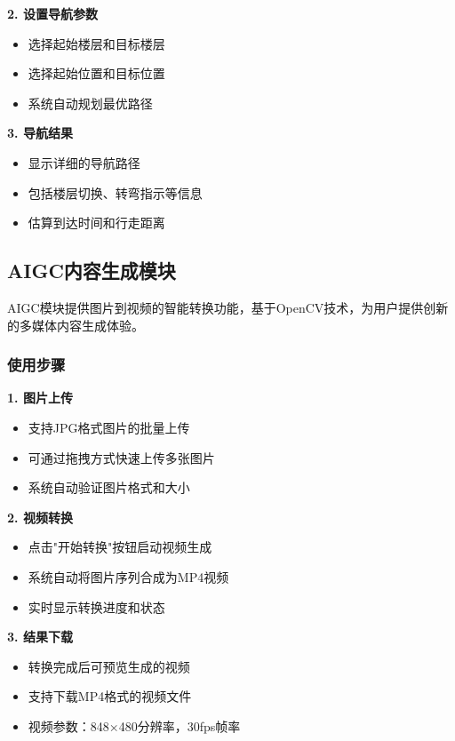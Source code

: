 \documentclass[12pt, a4paper]{article}
\begin{document}
\textbf{2. 设置导航参数}
\begin{itemize}
    \item 选择起始楼层和目标楼层
    \item 选择起始位置和目标位置
    \item 系统自动规划最优路径
\end{itemize}

\textbf{3. 导航结果}
\begin{itemize}
    \item 显示详细的导航路径
    \item 包括楼层切换、转弯指示等信息
    \item 估算到达时间和行走距离
\end{itemize}

\subsection{AIGC内容生成模块}

\begin{warningbox}[title={AI内容生成}]
AIGC模块提供图片到视频的智能转换功能，基于OpenCV技术，为用户提供创新的多媒体内容生成体验。
\end{warningbox}

\subsubsection{使用步骤}

\textbf{1. 图片上传}
\begin{itemize}
    \item 支持JPG格式图片的批量上传
    \item 可通过拖拽方式快速上传多张图片
    \item 系统自动验证图片格式和大小
\end{itemize}

\textbf{2. 视频转换}
\begin{itemize}
    \item 点击"开始转换"按钮启动视频生成
    \item 系统自动将图片序列合成为MP4视频
    \item 实时显示转换进度和状态
\end{itemize}

\textbf{3. 结果下载}
\begin{itemize}
    \item 转换完成后可预览生成的视频
    \item 支持下载MP4格式的视频文件
    \item 视频参数：848×480分辨率，30fps帧率
\end{itemize}
\end{document}
